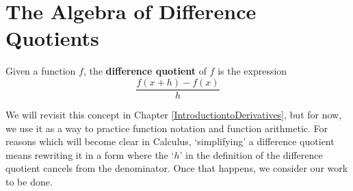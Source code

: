 \documentclass{ximera}
\begin{document}
	\author{Stitz-Zeager}
    
\section{The Algebra of Difference Quotients}


\begin{definition}\label{differencequotient}

Given a function $f$, the \textbf{difference quotient} of $f$ is the expression \[ \dfrac{f(x+h) - f(x)}{h} \]

\end{definition}


We will revisit this concept in Chapter \ref{IntroductiontoDerivatives}, but for now, we use it as a way to practice function notation and function arithmetic.  For reasons which will become clear in Calculus,  `simplifying' a difference quotient means rewriting it in a form where the `$h$' in the definition of the difference quotient cancels from the denominator. Once that happens, we consider our work to be done.
\end{document}
